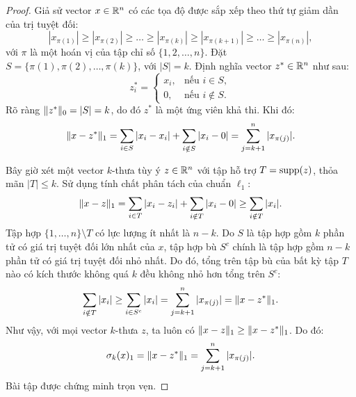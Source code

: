 \begin{proof}
Giả sử vector $x \in \mathbb{R}^n$ có các tọa độ được sắp xếp theo thứ tự giảm dần của trị tuyệt đối:
\[
|x_{\pi(1)}| \ge |x_{\pi(2)}| \ge \dots \ge |x_{\pi(k)}| \ge |x_{\pi(k+1)}| \ge \dots \ge |x_{\pi(n)}|,
\]
với $\pi$ là một hoán vị của tập chỉ số $\{1, 2, \dots, n\}$. Đặt $S = \{\pi(1), \pi(2), \dots, \pi(k)\}$, với $|S| = k$. 
Định nghĩa vector $z^* \in \mathbb{R}^n$ như sau:
\[
z^*_i = 
\begin{cases}
x_i, & \text{nếu } i \in S, \\
0, & \text{nếu } i \notin S.
\end{cases}
\]
Rõ ràng $\|z^*\|_0 = |S| = k$, do đó $z^*$ là một ứng viên khả thi. Khi đó:
\[
\|x - z^*\|_1 = \sum_{i \in S} |x_i - x_i| + \sum_{i \notin S} |x_i - 0| = \sum_{j=k+1}^n |x_{\pi(j)}|.
\]

Bây giờ xét một vector $k$-thưa tùy ý $z \in \mathbb{R}^n$ với tập hỗ trợ $T = \operatorname{supp}(z)$, thỏa mãn $|T| \le k$.
Sử dụng tính chất phân tách của chuẩn $\ell_1$:
\[
\|x - z\|_1 = \sum_{i \in T} |x_i - z_i| + \sum_{i \notin T} |x_i - 0| \ge \sum_{i \notin T} |x_i|.
\]
Tập hợp $\{1, \dots, n\} \setminus T$ có lực lượng ít nhất là $n - k$. Do $S$ là tập hợp gồm $k$ phần tử có giá trị tuyệt đối lớn nhất của $x$, tập hợp bù $S^c$ chính là tập hợp gồm $n - k$ phần tử có giá trị tuyệt đối nhỏ nhất. Do đó, tổng trên tập bù của bất kỳ tập $T$ nào có kích thước không quá $k$ đều không nhỏ hơn tổng trên $S^c$:
\[
\sum_{i \notin T} |x_i| \ge \sum_{i \in S^c} |x_i| = \sum_{j=k+1}^n |x_{\pi(j)}| = \|x - z^*\|_1.
\]
Như vậy, với mọi vector $k$-thưa $z$, ta luôn có $\|x - z\|_1 \ge \|x - z^*\|_1$. Do đó:
\[
\sigma_k(x)_1 = \|x - z^*\|_1 = \sum_{j=k+1}^n |x_{\pi(j)}|.
\]
Bài tập được chứng minh trọn vẹn.
\end{proof}
